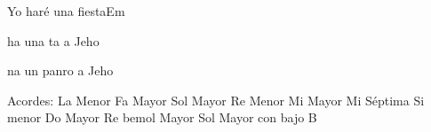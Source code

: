 \documentclass[12pt, spanish]{book}
\begin{document}
\begin{song}{Yo haré una fiesta}{Em}
\begin{SBExtraKeys}
{\begin{SBChorus}
                 ha una ta a Jeho   

                na un panro a Jeho   
            \end{SBChorus}

            \ifChordBk
            \begin{SBOpGroup}
                Acordes:\break
                \upchord{\Am}\qquad La Menor \hfill
                \upchord{\F}\qquad Fa Mayor \hfill\null\break
                \upchord{\G}\qquad Sol Mayor \hfill
                \upchord{\Dm}\qquad Re Menor \hfill\null\break
                \upchord{\E}\qquad Mi Mayor \hfill
                \upchord{\Eseven}\qquad Mi S\'eptima \hfill\null\break
                \upchord{\Bm}\quad Si menor \hfill
                \upchord{\C}\qquad Do Mayor \hfill\null\break
                \upchord{\Dflat}\qquad Re bemol Mayor \hfill
                \upchord{\GB}\qquad Sol Mayor con bajo B \hfill\null\break
            \end{SBOpGroup}
            \fi
        }\end{SBExtraKeys}
    \end{song}
\end{document}
